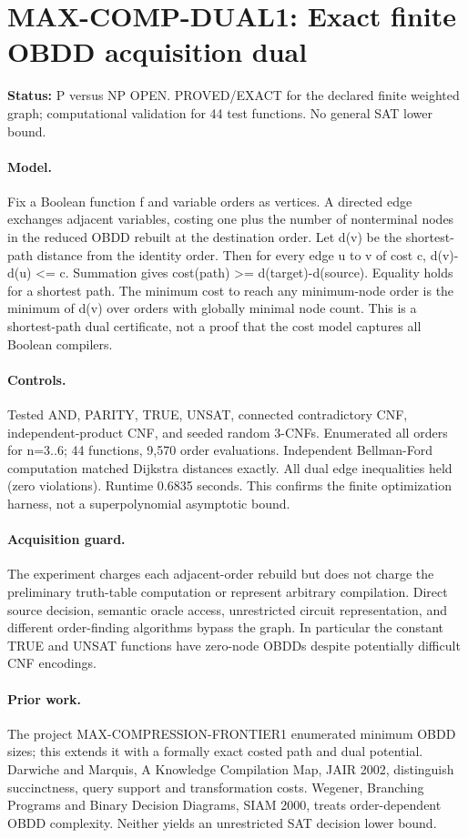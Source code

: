 \documentclass{article}
\begin{document}
\section*{MAX-COMP-DUAL1: Exact finite OBDD acquisition dual}
\textbf{Status:} P versus NP OPEN. PROVED/EXACT for the declared finite weighted graph; computational validation for 44 test functions. No general SAT lower bound.
\paragraph{Model.} Fix a Boolean function f and variable orders as vertices. A directed edge exchanges adjacent variables, costing one plus the number of nonterminal nodes in the reduced OBDD rebuilt at the destination order. Let d(v) be the shortest-path distance from the identity order. Then for every edge u to v of cost c, d(v)-d(u) <= c. Summation gives cost(path) >= d(target)-d(source). Equality holds for a shortest path. The minimum cost to reach any minimum-node order is the minimum of d(v) over orders with globally minimal node count. This is a shortest-path dual certificate, not a proof that the cost model captures all Boolean compilers.
\paragraph{Controls.} Tested AND, PARITY, TRUE, UNSAT, connected contradictory CNF, independent-product CNF, and seeded random 3-CNFs. Enumerated all orders for n=3..6; 44 functions, 9,570 order evaluations. Independent Bellman-Ford computation matched Dijkstra distances exactly. All dual edge inequalities held (zero violations). Runtime 0.6835 seconds. This confirms the finite optimization harness, not a superpolynomial asymptotic bound.
\paragraph{Acquisition guard.} The experiment charges each adjacent-order rebuild but does not charge the preliminary truth-table computation or represent arbitrary compilation. Direct source decision, semantic oracle access, unrestricted circuit representation, and different order-finding algorithms bypass the graph. In particular the constant TRUE and UNSAT functions have zero-node OBDDs despite potentially difficult CNF encodings.
\paragraph{Prior work.} The project MAX-COMPRESSION-FRONTIER1 enumerated minimum OBDD sizes; this extends it with a formally exact costed path and dual potential. Darwiche and Marquis, A Knowledge Compilation Map, JAIR 2002, distinguish succinctness, query support and transformation costs. Wegener, Branching Programs and Binary Decision Diagrams, SIAM 2000, treats order-dependent OBDD complexity. Neither yields an unrestricted SAT decision lower bound.
\end{document}
